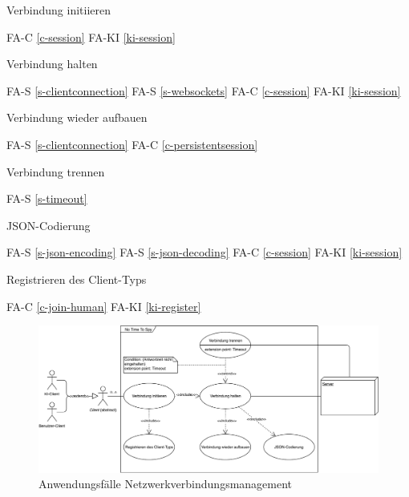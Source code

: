 Verbindung initiieren

FA-C \ref{c-session} %
FA-KI \ref{ki-session} %

Verbindung halten

FA-S \ref{s-clientconnection} %
FA-S \ref{s-websockets} %
FA-C \ref{c-session} %
FA-KI \ref{ki-session} %

Verbindung wieder aufbauen

FA-S \ref{s-clientconnection} %
FA-C \ref{c-persistentsession} %

Verbindung trennen

FA-S \ref{s-timeout} %

JSON-Codierung

FA-S \ref{s-json-encoding} %
FA-S \ref{s-json-decoding} %
FA-C \ref{c-session} %
FA-KI \ref{ki-session} %

Registrieren des Client-Typs

FA-C \ref{c-join-human} %
FA-KI \ref{ki-register} %

\begin{figure}
  \centering
  \includegraphics[width=\textwidth]{Meilenstein02/use_case_network.pdf}
  \caption{Anwendungsfälle Netzwerkverbindungsmanagement}
\end{figure}